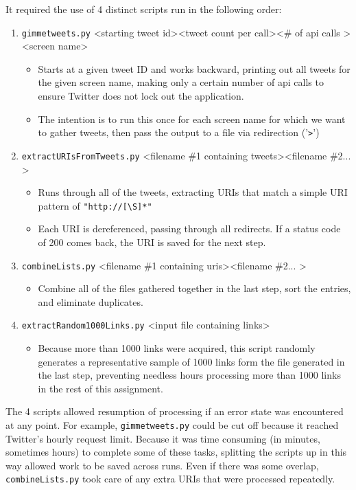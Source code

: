 \documentclass[letterpaper,11pt]{article}
\begin{document}
It required the use of 4 distinct scripts run in the following order:
\begin{enumerate}
\item \verb+gimmetweets.py+ \textless starting tweet id\textgreater \textless tweet count per call\textgreater \textless \# of api calls \textgreater \textless screen name\textgreater
	\begin{itemize}
	\item Starts at a given tweet ID and works backward, printing out all tweets for the given screen name, making only a certain number of api calls to ensure Twitter does not lock out the application.
	\item The intention is to run this once for each screen name for which we want to gather tweets, then pass the output to a file via redirection ('\verb+>+')
	\end{itemize}
\item \verb+extractURIsFromTweets.py+ \textless filename \#1 containing tweets\textgreater \textless filename \#2... \textgreater
	\begin{itemize}
	\item Runs through all of the tweets, extracting URIs that match a simple URI pattern of \verb+"http://[\S]*"+
	\item Each URI is dereferenced, passing through all redirects.  If a status code of 200 comes back, the URI is saved for the next step.
	\end{itemize}
\item \verb+combineLists.py+ \textless filename \#1 containing uris\textgreater \textless filename \#2... \textgreater
	\begin{itemize}
	\item Combine all of the files gathered together in the last step, sort the entries, and eliminate duplicates.
	\end{itemize}
\item \verb+extractRandom1000Links.py+ \textless input file containing links\textgreater
	\begin{itemize}
	\item Because more than 1000 links were acquired, this script randomly generates a representative sample of 1000 links form the file generated in the last step, preventing needless hours processing more than 1000 links in the rest of this assignment.
	\end{itemize}
\end{enumerate}

The 4 scripts allowed resumption of processing if an error state was encountered at any point.  For example, \verb+gimmetweets.py+ could be cut off because it reached Twitter's hourly request limit\cite{twitter}.  Because it was time consuming (in minutes, sometimes hours) to complete some of these tasks, splitting the scripts up in this way allowed work to be saved across runs.  Even if there was some overlap, \verb+combineLists.py+ took care of any extra URIs that were processed repeatedly.
\end{document}
